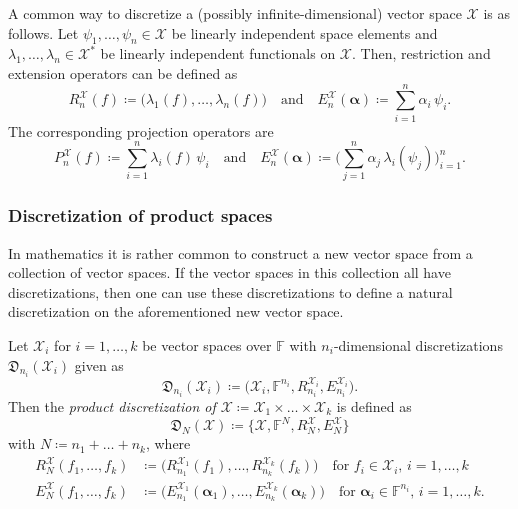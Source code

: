 \documentclass[a4paper]{paper}
\newcommand*{\SPC}[1]{{\ensuremath{\mathscr{#1}}}}
\newcommand*{\SPCX}{\SPC{X}}
\newcommand{\FIELD}{{\ensuremath{\mathbb{F}}}}
\newcommand*{\EXT}[2]{\ensuremath{E_{#1}^{#2}}}
\newcommand*{\REST}[2]{\ensuremath{R_{#1}^{#2}}}
\newcommand*{\PROJ}[2]{\ensuremath{P_{#1}^{#2}}}
\newcommand*{\RnX}{{\ensuremath{\REST{n}{\SPC{X}}}}}
\newcommand*{\EnX}{{\ensuremath{\EXT{n}{\SPC{X}}}}}
\newcommand*{\PnX}{{\ensuremath{\PROJ{n}{\SPCX}}}}
\newcommand*{\DISCR}[2]{{\ensuremath{\mathfrak{D}_{#2}(#1)}}}
\newcommand{\valpha}{\boldsymbol{\alpha}}
\begin{document}
\begin{examp}
 A common way to discretize a (possibly infinite-dimensional) vector space $\SPCX$ is as follows. Let 
 $\psi_1, \dotsc, \psi_n \in \SPCX$ be linearly independent space elements and 
 $\lambda_1, \dotsc, \lambda_n \in \SPCX^*$ be linearly independent functionals on $\SPCX$. Then, restriction and 
 extension operators can be defined as
 \begin{equation*}
  \RnX(f) \coloneqq  \big( \lambda_1(f), \dotsc, \lambda_n(f) \big) 
  \quad \text{and} \quad
  \EnX(\valpha) \coloneqq  \sum_{i=1}^n \alpha_i\, \psi_i.
 \end{equation*}
 The corresponding projection operators are
 \begin{equation*}
  \PnX(f) \coloneqq  \sum_{i=1}^n \lambda_i(f)\, \psi_i
  \quad \text{and} \quad
  \EnX(\valpha) \coloneqq  \bigg( \sum_{j=1}^n \alpha_j\, \lambda_i(\psi_j) \bigg)_{i=1}^n.
 \end{equation*}

\end{examp}


\subsubsection{Discretization of product spaces}
\label{subsubsec:discr:space:prod}

In mathematics it is rather common to construct a new vector space from a collection of vector spaces. If the vector 
spaces in this collection all have discretizations, then one can use these discretizations to define a natural 
discretization on the aforementioned new vector space.

\begin{definition}
 \label{def:discr:space:prod:prod_space_discr}
 Let $\SPCX_i$ for $i=1,\dotsc,k$ be vector spaces over $\FIELD$ with $n_i$-dimensional discretizations 
 $\DISCR{\SPCX_i}{n_i}$ given as
 \begin{equation*}
  \DISCR{\SPCX_i}{n_i} \coloneqq  \bigl( \SPCX_i, \FIELD^{n_i}, \REST{n_i}{\SPCX_i}, \EXT{n_i}{\SPCX_i} \bigr). 
 \end{equation*}
 Then the \emph{product discretization of $\SPCX \coloneqq  \SPCX_1 \times \dotsc \times \SPCX_k$} is defined as 
 \begin{equation*}
  \DISCR{\SPCX}{N} \coloneqq \{\SPCX, \FIELD^N, \REST{N}{\SPCX}, \EXT{N}{\SPCX} \}
 \end{equation*}
 with $N \coloneqq  n_1 + \dotsc + n_k$, where
 \begin{align*}
  \REST{N}{\SPCX}(f_1,\dotsc,f_k) &\coloneqq  \bigl( \REST{n_1}{\SPCX_1}(f_1),\dotsc,\REST{n_k}{\SPCX_k}(f_k) \bigr)
  \quad\text{for $f_i\in \SPCX_i$, $i=1,\dotsc,k$} \\
  \EXT{N}{\SPCX}(f_1,\dotsc,f_k) &\coloneqq  \bigl( \EXT{n_1}{\SPCX_1}(\valpha_1),\dotsc,\EXT{n_k}{\SPCX_k}(\valpha_k) 
  \bigr)
  \quad\text{for $\valpha_i\in \FIELD^{n_i}$, $i=1,\dotsc,k$.}
 \end{align*}
\end{definition}
\end{document}
